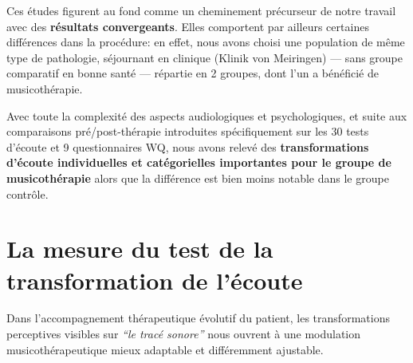 Ces études figurent au fond comme un cheminement précurseur de notre
travail avec des \textbf{résultats convergeants}. Elles comportent par ailleurs certaines différences dans la
 procédure:  %
 en effet, nous avons choisi
 une population de même type de pathologie, séjournant en clinique (Klinik von Meiringen) --- sans
 groupe comparatif en bonne santé --- répartie en 2 groupes,
dont l'un a bénéficié de
musicothérapie.


Avec toute la
complexité des aspects audiologiques et psychologiques,
et suite aux comparaisons
pré/post-thérapie introduites spécifiquement sur les 30 tests d'écoute et 9 questionnaires WQ, nous
avons relevé des \textbf{transformations d'écoute
 individuelles et
catégorielles importantes pour le groupe de musicothérapie} alors que
la différence est bien moins notable dans le groupe contrôle.








\section{La mesure du test de la trans\-for\-ma\-tion de l'écoute}
Dans l'accompagnement thérapeutique évolutif du patient,
 les transformations perceptives visibles sur
\textit{``le tracé sonore''} nous ouvrent à une modulation
musicothérapeutique mieux adaptable et différemment ajustable.

